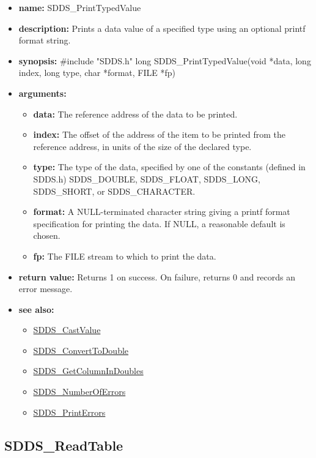 \documentclass[11pt]{article}
\newcommand{\progref}[1]{\hyperref{SDDS_#1}{{\tt SDDS\_#1} (}{)}{SDDS_#1}}
\begin{document}
\begin{itemize}
\item {\bf name:}\newline
SDDS\_PrintTypedValue
\item {\bf description:}\newline
Prints a data value of a specified type using an optional  printf format string.
\item {\bf synopsis:} \#include "SDDS.h"\newline
long SDDS\_PrintTypedValue(void *data, long index, long type, char *format, FILE *fp)
\item {\bf arguments:}
\begin{itemize}
\item {\bf data:} The reference address of the data to be printed.
\item {\bf index:} The offset of the address of the item to be printed from the reference address, in units of the size of the declared type.
\item {\bf type:} The type of the data, specified by one of the constants (defined in SDDS.h) SDDS\_DOUBLE, SDDS\_FLOAT, SDDS\_LONG, SDDS\_SHORT, or SDDS\_CHARACTER.
\item {\bf format:} A NULL-terminated character string giving a  printf format specification for printing the data. If NULL, a reasonable default is chosen.
\item {\bf fp:} The FILE stream to which to print the data.
\end{itemize}
\item {\bf return value:}\newline
Returns 1 on success. On failure, returns 0 and records an error message.
\item {\bf see also:}
\begin{itemize}
\item \progref{CastValue}
\item \progref{ConvertToDouble}
\item \progref{GetColumnInDoubles}
\item \progref{NumberOfErrors}
\item \progref{PrintErrors}
\end{itemize}
\end{itemize}

\subsection{SDDS\_ReadTable}
\label{SDDS_ReadTable}
\end{document}
